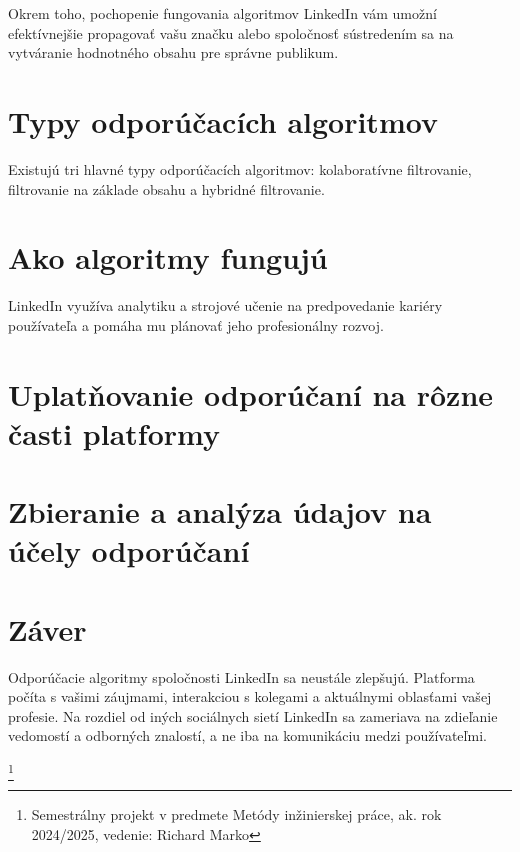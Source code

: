\documentclass[twoside,slovak,a4paper]{coursepaper}
\begin{document}
Okrem toho, pochopenie fungovania algoritmov LinkedIn vám umožní efektívnejšie propagovať vašu značku alebo spoločnosť sústredením sa na vytváranie hodnotného obsahu pre správne publikum.


\section{Typy odporúčacích algoritmov} \label{Typy}
Existujú tri hlavné typy odporúčacích algoritmov: kolaboratívne filtrovanie, filtrovanie na základe obsahu a hybridné filtrovanie. 

\section{Ako algoritmy fungujú} \label{fungovanie}
LinkedIn využíva analytiku a strojové učenie na predpovedanie kariéry používateľa a pomáha mu plánovať jeho profesionálny rozvoj.

\section{Uplatňovanie odporúčaní na rôzne časti platformy} \label{Uplatňovanie}


\section{Zbieranie a analýza údajov na účely odporúčaní} \label{analýza údajov}
 

\section{Záver} \label{zaver}
Odporúčacie algoritmy spoločnosti LinkedIn sa neustále zlepšujú. Platforma počíta s vašimi záujmami, interakciou s kolegami a aktuálnymi oblasťami vašej profesie. Na rozdiel od iných sociálnych sietí LinkedIn sa zameriava na zdieľanie vedomostí a odborných znalostí, a ne iba na komunikáciu medzi používateľmi.

\thanks{Semestrálny projekt v predmete Metódy inžinierskej práce, ak. rok 2024/2025, vedenie: Richard Marko}


 
\end{document}
